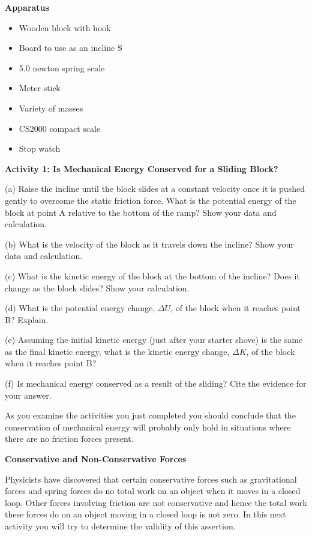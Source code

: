 \textbf{Apparatus} 

\begin{itemize}
\item Wooden block with hook 
\item Board to use as an incline S
\item 5.0 newton spring scale 
\item Meter stick 
\item Variety of masses 
\item CS2000 compact scale
\item Stop watch
\end{itemize}
\textbf{Activity 1: Is Mechanical Energy Conserved for a Sliding Block? }

(a) Raise the incline until the block slides at a constant velocity once it
is pushed gently to overcome the static friction force. What is the potential
energy of the block at point A relative to the bottom of the ramp? Show your
data and calculation.
\vspace{30mm}

\newpage

(b) What is the velocity of the block as it travels down the incline? Show your
data and calculation.
\vspace{20mm}

(c) What is the kinetic energy of the block at the bottom of the incline? Does
it change as the block slides? Show your calculation.
\vspace{20mm}

(d) What is the potential energy change, $\Delta U$, of the block when it reaches point B? Explain.
\vspace{20mm}

(e) Assuming the initial kinetic energy (just after your starter shove) is the
same as the final kinetic energy, what is the kinetic energy change, $\Delta K$, of the block when it reaches point B? 
\vspace{20mm}

(f) Is mechanical energy conserved as a result of the sliding? Cite the evidence for your answer.
\vspace{20mm}

As you examine the activities you just completed you should conclude that the
conservation of mechanical energy will probably only hold in situations where
there are no friction forces present. 

\textbf{Conservative and Non-Conservative Forces} 

Physicists have discovered that certain conservative forces such as gravitational forces and spring forces do no total work on an object when it moves in a closed loop. Other forces involving friction are not conservative and hence the total work these forces do on an object moving in a closed loop is not zero. In this next activity you will try to determine the validity of this assertion.


